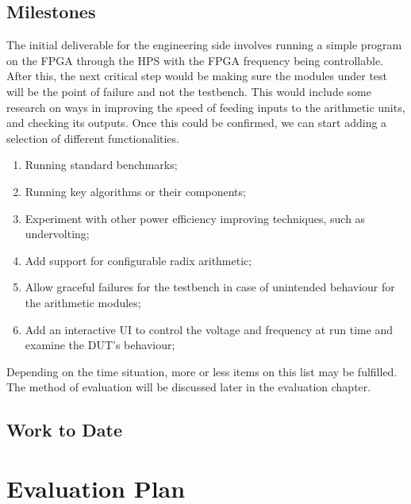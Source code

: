 \documentclass[journal]{IEEEtran}
\begin{document}
\subsection{Milestones}
The initial deliverable for the engineering side involves running a simple
program on the FPGA through the HPS with the FPGA frequency being controllable.
After this, the next critical step would be making sure the modules under test
will be the point of failure and not the testbench.
This would include some research on ways in improving the speed of feeding
inputs to the arithmetic units, and checking its outputs.
Once this could be confirmed, we can start adding a selection of different functionalities.

\begin{enumerate}
  \item Running standard benchmarks;
  \item Running key algorithms or their components;
  \item Experiment with other power efficiency improving techniques,
        such as undervolting;
  \item Add support for configurable radix arithmetic;
  \item Allow graceful failures for the testbench in case of unintended
        behaviour for the arithmetic modules;
  \item Add an interactive UI to control the voltage and frequency at run time
        and examine the DUT’s behaviour;
\end{enumerate}

Depending on the time situation, more or less items on this list may be fulfilled.
The method of evaluation will be discussed later in the evaluation chapter.
\subsection{Work to Date}



\section{Evaluation Plan}
\end{document}
